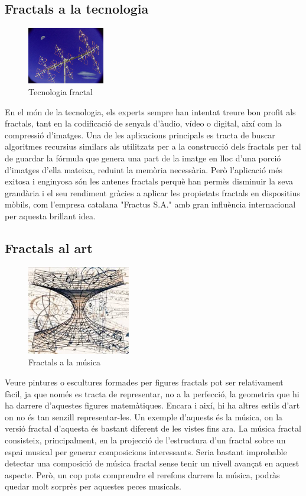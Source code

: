 \documentclass[12pt]{report}
\begin{document}
\subsection{Fractals a la tecnologia}
\begin{figure}
    \includegraphics[width=0.3\textwidth]{antena.jpg}
    \caption{Tecnologia fractal}
    \end{figure}
En el món de la tecnologia, els experts sempre han intentat treure bon profit als fractals, tant en la codificació de senyals d'àudio, vídeo o digital, així com la compressió d'imatges. Una de les aplicacions principals es tracta de buscar algoritmes recursius similars als utilitzats per a la construcció dels fractals per tal de guardar la fórmula que genera una part de la imatge en lloc d'una porció d'imatges d'ella mateixa, reduint la memòria necessària.
Però l'aplicació més exitosa i enginyosa són les antenes fractals perquè han permès disminuir la seva grandària i el seu rendiment gràcies a aplicar les propietats fractals en
dispositius mòbils, com l'empresa catalana "Fractus S.A." amb gran influència internacional per aquesta brillant idea. 

\subsection{Fractals al art}


\begin{figure}
    \includegraphics[width=0.4\textwidth]{musica.jpg}
     \caption{Fractals a la música}
    \end{figure}Veure pintures o escultures formades per figures fractals pot ser relativament fàcil, ja que només es tracta de representar, no a la perfecció, la geometria que hi ha darrere d'aquestes figures matemàtiques. Encara i així, hi ha altres estils d'art on no és tan senzill representar-les. Un exemple d'aquests és la música, on la versió fractal d'aquesta és bastant diferent de les vistes fins ara. La música fractal consisteix, principalment, en la projecció de l'estructura d'un fractal sobre un espai musical per generar composicions interessants.
Seria bastant improbable detectar una composició de música fractal sense tenir un nivell avançat en aquest aspecte. Però, un cop pots comprendre el rerefons darrere la música, podràs quedar molt sorprès per aquestes peces musicals.
    \newpage
    
\end{document}
